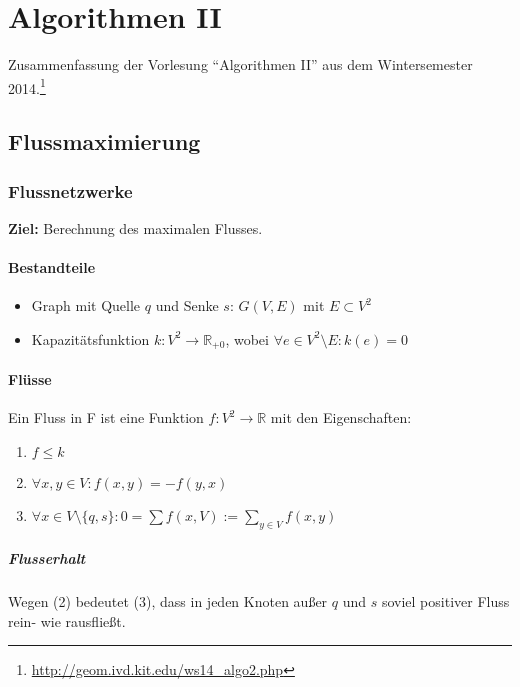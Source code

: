 \chapter{Algorithmen II}

Zusammenfassung der Vorlesung "`Algorithmen II"' aus dem Wintersemester 2014.\footnote{\url{http://geom.ivd.kit.edu/ws14_algo2.php}}


\section{Flussmaximierung}

\subsection{Flussnetzwerke}
\textbf{Ziel:} Berechnung des maximalen Flusses.

\subsubsection{Bestandteile}
\begin{itemize}
	\item Graph mit Quelle \(q\) und Senke \(s\): \(G(V,E)\) mit \(E \subset V^2\)
	\item Kapazitätsfunktion \(k : V^2 \rightarrow \mathbb{R}_{+0}\), wobei \(\forall e \in V^2 \setminus E: k(e) = 0\)
\end{itemize}

\subsubsection{Flüsse}
Ein Fluss in F ist eine Funktion \(f:V^2\rightarrow\mathbb{R}\) mit den Eigenschaften:
\begin{enumerate}
	\item \(f \leq k\)
	\item \(\forall x,y \in V : f(x,y) = -f(y,x)\)
	\item \(\forall x \in V \setminus \{ q,s \}: 0 = \sum f(x,V) := \sum_{y\in V} f(x,y)\)
\end{enumerate}
\paragraph{Flusserhalt} Wegen (2) bedeutet (3), dass in jeden Knoten außer \(q\) und \(s\) soviel positiver Fluss rein- wie rausfließt.

